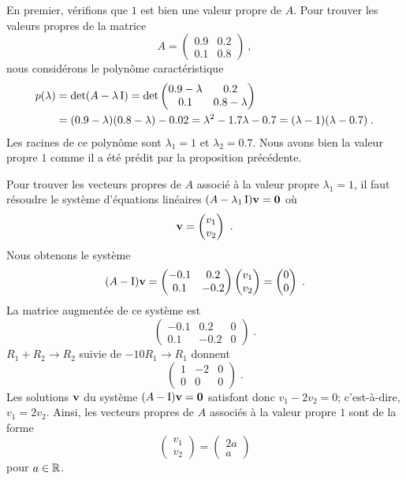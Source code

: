 {\begin{egg}
En premier, vérifions que $1$ est bien une valeur propre de $A$.  Pour
trouver les valeurs propres de la matrice
\[
A = \begin{pmatrix} 0.9 & 0.2 \\ 0.1 & 0.8 \end{pmatrix} \ ,
\]
nous considérons le polynôme caractéristique
\begin{align*}
p(\lambda) &= \det(A - \lambda \operatorname{I}) = \det
\begin{pmatrix}
0.9-\lambda & 0.2 \\ 0.1 & 0.8-\lambda  
\end{pmatrix} \\
&= (0.9-\lambda)(0.8-\lambda) - 0.02 = \lambda^2 - 1.7 \lambda - 0.7
= (\lambda - 1)(\lambda - 0.7) \; .
\end{align*}
Les racines de ce polynôme sont $\lambda_1 = 1$ et $\lambda_2 = 0.7$.
Nous avons bien la valeur propre $1$ comme il a été prédit par la
proposition précédente.

Pour trouver les vecteurs propres de $A$ associé à la valeur propre
$\lambda_1=1$, il faut résoudre le système d'équations linéaires
$(A-\lambda_1\operatorname{I}) \mathbf{v} = \mathbf{0}$ où
\[
\mathbf{v} = \begin{pmatrix} v_1 \\ v_2 \end{pmatrix} \ .
\]
Nous obtenons le système
\[
(A-\operatorname{I}) \mathbf{v} =
\begin{pmatrix} -0.1 & 0.2 \\ 0.1 & -0.2 \end{pmatrix}
\begin{pmatrix} v_1 \\ v_2 \end{pmatrix} =
\begin{pmatrix} 0 \\ 0 \end{pmatrix}\; .
\]
La matrice augmentée de ce système est
\[
\left(\begin{array}{rr|r}
-0.1 & 0.2 & 0 \\
0.1 & -0.2 & 0
\end{array}\right) \; .
\]
$R_1 + R_2 \to R_2$ suivie de $-10R_1 \to R_1$ donnent
\[
\left(\begin{array}{rr|r}
1 & -2 & 0 \\
0 & 0 & 0
\end{array}\right) \; .
\]
Les solutions $\mathbf{v}$ du système $(A-\operatorname{I}) \mathbf{v} = \mathbf{0}$
satisfont donc $v_1 -2 v_2 = 0$; c'est-à-dire, $v_1 =2 v_2$.  Ainsi,
les vecteurs propres de $A$ associés à la valeur propre $1$ sont de la
forme
\[
\begin{pmatrix} v_1 \\ v_2 \end{pmatrix} =
\begin{pmatrix} 2a \\ a \end{pmatrix}
\]
pour $a \in \mathbb{R}$.


\end{egg}}
